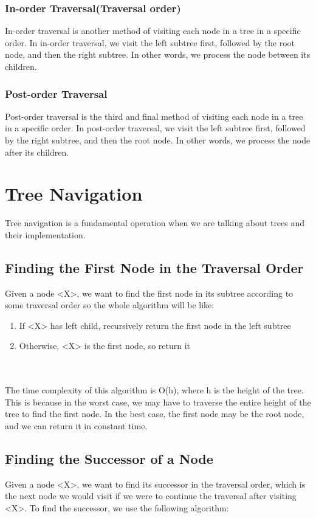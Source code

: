 \documentclass[a4paper, 11pt, oneside]{book} %
\begin{document}
\subsubsection{In-order Traversal(Traversal order)}
In-order traversal is another method of visiting each node in a tree in a specific order. In in-order traversal, we visit the left subtree first, followed by the root node, and then the right subtree. In other words, we process the node between its children. 

\subsubsection{Post-order Traversal}
Post-order traversal is the third and final method of visiting each node in a tree in a specific order. In post-order traversal, we visit the left subtree first, followed by the right subtree, and then the root node. In other words, we process the node after its children.
\\


\section{Tree Navigation}
Tree navigation is a fundamental operation when we are talking about trees and their implementation.

\subsection{Finding the First Node in the Traversal Order}
Given a node <X>, we want to find the first node in its subtree according to some traversal order so the whole algorithm will be like:
\begin{enumerate}
    \item  If <X> has left child, recursively return the first node in the left subtree
    \item  Otherwise, <X> is the first node, so return it
\end{enumerate}
\\
\\
The time complexity of this algorithm is O(h), where h is the height of the tree. This is because in the worst case, we may have to traverse the entire height of the tree to find the first node. In the best case, the first node may be the root node, and we can return it in constant time.

\subsection{Finding the Successor of a Node}
Given a node <X>, we want to find its successor in the traversal order, which is the next node we would visit if we were to continue the traversal after visiting <X>. To find the successor, we use the following algorithm:
\end{document}
